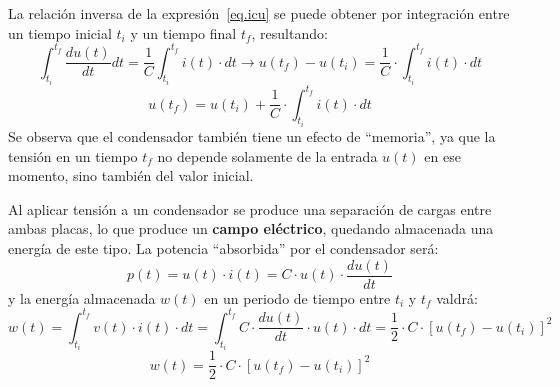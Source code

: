 	La relación inversa de la expresión~\eqref{eq.icu} se puede obtener por integración entre un tiempo inicial $t_i$ y un tiempo final $t_f$, resultando:
	\begin{equation*}
		\int_{t_i}^{t_f} \dfrac{du(t)}{dt}dt=\dfrac{1}{C}\int_{t_i}^{t_f}i(t)\cdot dt \rightarrow u(t_f)-u(t_i)=\dfrac{1}{C}\cdot\int_{t_i}^{t_f} i(t)\cdot dt
	\end{equation*}
	\begin{equation}\label{eq.u_C}
		\boxed{u(t_f)=u(t_i)+\dfrac{1}{C}\cdot\int_{t_i}^{t_f} i(t)\cdot dt}
	\end{equation}
	Se observa que el condensador también tiene un efecto de ``memoria'', ya que la tensión en un tiempo $t_f$ no depende solamente de la entrada $u(t)$ en ese momento, sino también del valor inicial.
	
	Al aplicar tensión a un condensador se produce una separación de cargas entre ambas placas, lo que produce un \textbf{campo eléctrico}, quedando almacenada una energía de este tipo. La potencia ``absorbida'' por el condensador será:
	\begin{equation*}
		p(t)=u(t)\cdot i(t)=C\cdot u(t)\cdot\dfrac{du(t)}{dt}
	\end{equation*}
	y la energía almacenada $w(t)$ en un periodo de tiempo entre $t_i$ y $t_f$ valdrá:
	\begin{equation*}
		w(t)=\int_{t_i}^{t_f}v(t)\cdot i(t)\cdot dt=\int_{t_i}^{t_f}C\cdot\dfrac{du(t)}{dt}\cdot u(t)\cdot dt=\dfrac{1}{2}\cdot C\cdot [u(t_f)-u(t_i)]^2
	\end{equation*}
	\begin{equation}
		\boxed{w(t)=\dfrac{1}{2}\cdot C\cdot [u(t_f)-u(t_i)]^2}
	\end{equation}
	
